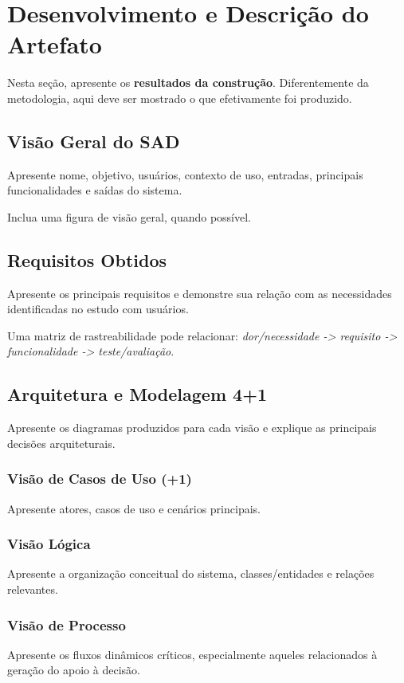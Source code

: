 \documentclass[12pt]{article}
\begin{document}
\section{Desenvolvimento e Descrição do Artefato}
\label{sec:artefato}

Nesta seção, apresente os \textbf{resultados da construção}. Diferentemente da metodologia, aqui deve ser mostrado o que efetivamente foi produzido.

\subsection{Visão Geral do SAD}

Apresente nome, objetivo, usuários, contexto de uso, entradas, principais funcionalidades e saídas do sistema.

Inclua uma figura de visão geral, quando possível.

\subsection{Requisitos Obtidos}

Apresente os principais requisitos e demonstre sua relação com as necessidades identificadas no estudo com usuários.

Uma matriz de rastreabilidade pode relacionar:
\textit{dor/necessidade -> requisito -> funcionalidade -> teste/avaliação}.

\subsection{Arquitetura e Modelagem 4+1}

Apresente os diagramas produzidos para cada visão e explique as principais decisões arquiteturais.

\subsubsection{Visão de Casos de Uso (+1)}
Apresente atores, casos de uso e cenários principais.

\subsubsection{Visão Lógica}
Apresente a organização conceitual do sistema, classes/entidades e relações relevantes.

\subsubsection{Visão de Processo}
Apresente os fluxos dinâmicos críticos, especialmente aqueles relacionados à geração do apoio à decisão.
\end{document}
